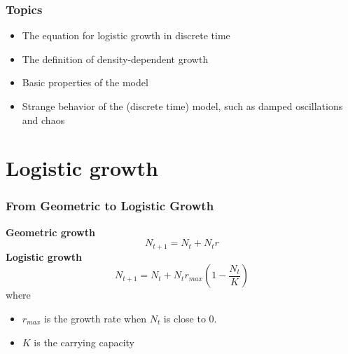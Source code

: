 \documentclass[color=usenames,dvipsnames]{beamer}\usepackage[]{graphicx}\usepackage[]{color}
\begin{document}
\begin{frame}[plain]
  \frametitle{Topics}
  \Large
  \begin{itemize}[<+->]
    \item The equation for logistic growth in discrete time
    \item The definition of density-dependent growth
    \item Basic properties of the model
    \item Strange behavior of the (discrete time) model, such as damped oscillations and chaos
  \end{itemize}
\end{frame}



\section{Logistic growth}


\begin{frame}
  \frametitle{From Geometric to Logistic Growth}
  \large
  {\bf Geometric growth}
  \[
    N_{t+1} = N_t + N_tr
  \]
  \pause
  {\bf Logistic growth}
  \[
    N_{t+1} = N_t + N_t r_{max}\left(1 - \frac{N_t}{K}\right)
  \]
  where \\
  \begin{itemize}
    \item $r_{max}$ is the growth rate when $N_t$ is close to 0. \\
    \item $K$ is the carrying capacity
  \end{itemize}
\end{frame}





\end{document}
